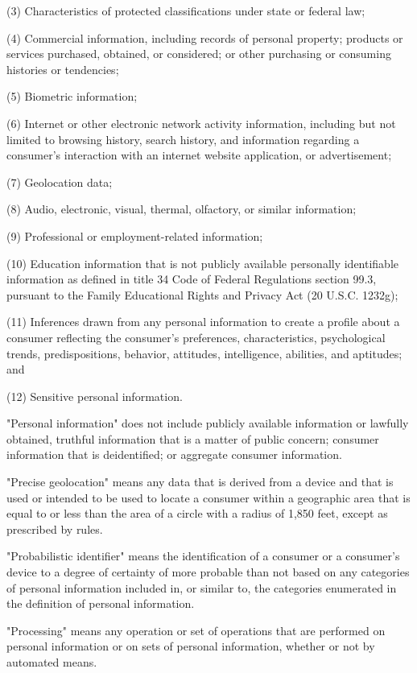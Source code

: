      (3)  Characteristics of protected classifications under state or federal law;

     (4)  Commercial information, including records of personal property; products or services purchased, obtained, or considered; or other purchasing or consuming histories or tendencies;

     (5)  Biometric information;

     (6)  Internet or other electronic network activity information, including but not limited to browsing history, search history, and information regarding a consumer's interaction with an internet website application, or advertisement;

     (7)  Geolocation data;

     (8)  Audio, electronic, visual, thermal, olfactory, or similar information;

     (9)  Professional or employment-related information;

    (10)  Education information that is not publicly available personally identifiable information as defined in title 34 Code of Federal Regulations section 99.3, pursuant to the Family Educational Rights and Privacy Act (20 U.S.C. 1232g);

    (11)  Inferences drawn from any personal information to create a profile about a consumer reflecting the consumer's preferences, characteristics, psychological trends, predispositions, behavior, attitudes, intelligence, abilities, and aptitudes; and

    (12)  Sensitive personal information.

"Personal information" does not include publicly available information or lawfully obtained, truthful information that is a matter of public concern; consumer information that is deidentified; or aggregate consumer information.

     "Precise geolocation" means any data that is derived from a device and that is used or intended to be used to locate a consumer within a geographic area that is equal to or less than the area of a circle with a radius of 1,850 feet, except as prescribed by rules.

     "Probabilistic identifier" means the identification of a consumer or a consumer's device to a degree of certainty of more probable than not based on any categories of personal information included in, or similar to, the categories enumerated in the definition of personal information.

     "Processing" means any operation or set of operations that are performed on personal information or on sets of personal information, whether or not by automated means.


